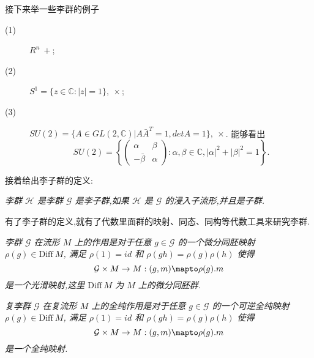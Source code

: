 
接下来举一些李群的例子
\begin{description}
	\item[(1)] $R^n~+$;
	\item[(2)] $S^1=\{z\in \mathbb{C}:|z|=1 \},~\times$;
	\item[(3)] $SU(2)=\{A \in GL(2,\mathbb{C})|A\bar{A}^T=1,det A = 1\},~\times$. 能够看出
	\begin{equation*}
		SU(2)=\left\lbrace\begin{pmatrix}
			\alpha&\beta\\
			-\bar{\beta}&\alpha
		\end{pmatrix}:\alpha,\beta\in\mathbb{C},|\alpha|^2+|\beta|^2 = 1
		 \right\rbrace.
	\end{equation*}
\end{description}

接着给出李子群的定义:
\begin{definition}[李子群]
	\emph{李群 $\mathcal{H}$ 是李群 $\mathcal{G}$ 是李子群,如果 $\mathcal{H}$ 是 $\mathcal{G}$ 的浸入子流形,并且是子群.}
\end{definition}

有了李子群的定义,就有了代数里面群的映射、同态、同构等代数工具来研究李群.

\begin{definition}[李群在流形上的作用]
	\emph{李群 $\mathcal{G}$ 在流形 $M$ 上的作用是对于任意 $g\in \mathcal{G}$ 的一个微分同胚映射 $\rho(g) \in \mathrm{Diff}~M$, 满足 $\rho(1) = id$ 和 $\rho(gh)=\rho(g)\rho(h)$ 使得
	\begin{equation*}
        \mathcal{G} \times M \to M : (g, m) \mapto \rho(g).m
	\end{equation*}
	是一个光滑映射,这里 $\mathrm{Diff}~M$ 为 $M$ 上的微分同胚群.}
\end{definition}

\begin{definition}[复李群在复流形上的全纯作用]
	\emph{复李群 $\mathcal{G}$ 在复流形 $M$ 上的全纯作用是对于任意 $g\in \mathcal{G}$ 的一个可逆全纯映射 $\rho(g) \in \mathrm{Diff}~M$, 满足 $\rho(1) = id$ 和 $\rho(gh)=\rho(g)\rho(h)$ 使得
	\begin{equation*}
        \mathcal{G} \times M \to M : (g, m) \mapto \rho(g).m
	\end{equation*}
	是一个全纯映射.}
\end{definition}

